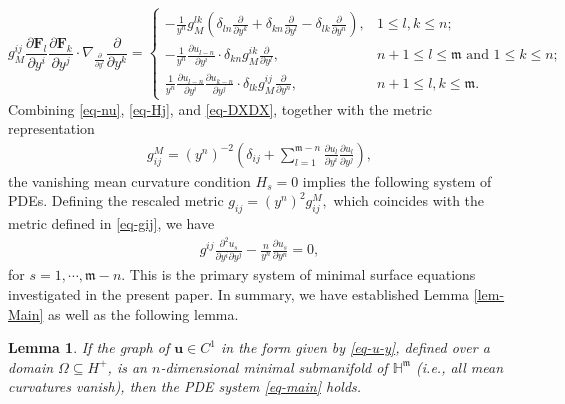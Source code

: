 \documentclass[11pt,reqno]{amsart}
\newcommand{\fm}{\mathfrak{m}}
\renewcommand{\leq}{\leqslant}
\newtheorem{lemma}[theorem]{Lemma}
\theoremstyle{definition}
\numberwithin{equation}{section}
\begin{document}
\begin{equation}\label{eq-DXDX}
g_M^{ij}\frac{\partial \mathbf{F}_l}{\partial y^i}\frac{\partial \mathbf{F}_k}{\partial y^j} 
    \cdot \nabla_{\frac{\partial}{\partial y^l}}\frac{\partial}{\partial y^k} = \begin{cases}
    -\frac{1}{y^{n}}g_M^{l k} \left(\delta_{ln}\frac{\partial}{\partial y^{k}} +\delta_{kn}\frac{\partial}{\partial y^{l}}-\delta_{lk}\frac{\partial}{\partial y^n}\right), & 1\leq l,k\leq n;\\
    -\frac{1}{y^{n}}\frac{\partial u_{l-n}}{\partial y^i} 
    \cdot\delta_{kn} g_M^{i k}\frac{\partial}{\partial y^l}, &n+1\leq l\leq \fm \text{ and } 1\leq k \leq n;\\
    \frac{1}{y^{n}}\frac{\partial u_{l-n}}{\partial y^i}\frac{\partial u_{k-n}}{\partial y^j}\cdot\delta_{l k}g_M^{ij}\frac{\partial}{\partial y^{n}}, &n+1\leq l,k \leq \fm.
    \end{cases}
\end{equation}
Combining \eqref{eq-nu}, \eqref{eq-Hj}, and \eqref{eq-DXDX}, together with the metric representation
\begin{align}
    g_{ij}^M = (y^n)^{-2}\left(\delta_{ij} +\sum_{l=1}^{\fm -n} \frac{\partial u_l}{\partial y^i}\frac{\partial u_l}{\partial y^j}\right),
\end{align}
the vanishing mean curvature condition $H_s=0$ implies the following system of PDEs. Defining the rescaled metric
$g_{ij} = (y^n)^{2}g_{ij}^M,$
which coincides with the metric defined in \eqref{eq-gij}, we have
\begin{align}\label{eq-main}
    g^{ij}\frac{\partial^2 u_s}{\partial y^i \partial y^j} - \frac{n}{y^{n}} \frac{\partial u_s}{\partial y^{n}} =0,
\end{align}
for $s=1, \cdots, \fm-n$. This is the primary system of minimal surface equations investigated in the present paper. In summary, we have established Lemma \ref{lem-Main} as well as the following lemma.

\begin{lemma}
If the graph of $\mathbf{u}\in C^1$ in the form given by \eqref{eq-u-y}, defined over a domain $\Omega \subseteq H^+$, is an $n$-dimensional minimal submanifold of $\mathbb{H}^\fm$ (i.e., all mean curvatures vanish), then the PDE system \eqref{eq-main} holds. 
\end{lemma}
\end{document}
